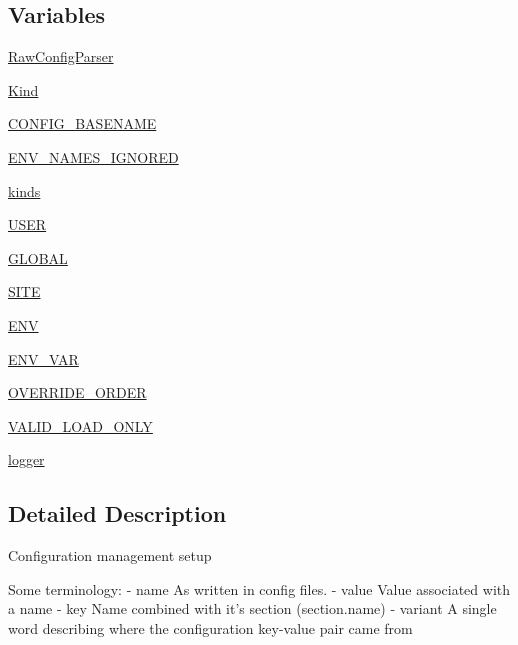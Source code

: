 \subsection*{Variables}
\begin{DoxyCompactItemize}
\item 
\hyperlink{namespacepip_1_1__internal_1_1configuration_a361d9f6d6543b48050190488d62c2578}{Raw\+Config\+Parser}
\item 
\hyperlink{namespacepip_1_1__internal_1_1configuration_acdbd1804aa9f7af14ec120c721d07514}{Kind}
\item 
\hyperlink{namespacepip_1_1__internal_1_1configuration_aeff9acc10ee6386b3ae91ac458894d28}{C\+O\+N\+F\+I\+G\+\_\+\+B\+A\+S\+E\+N\+A\+ME}
\item 
\hyperlink{namespacepip_1_1__internal_1_1configuration_ab592357a85c54489bd8a96208dfcadfa}{E\+N\+V\+\_\+\+N\+A\+M\+E\+S\+\_\+\+I\+G\+N\+O\+R\+ED}
\item 
\hyperlink{namespacepip_1_1__internal_1_1configuration_aee310fce28f137a503a38f842e42cfb3}{kinds}
\item 
\hyperlink{namespacepip_1_1__internal_1_1configuration_a831d1d031a4570a4ff6fdf11a30e3da3}{U\+S\+ER}
\item 
\hyperlink{namespacepip_1_1__internal_1_1configuration_a6a0959d1bd2012256f376680ea1f6ec4}{G\+L\+O\+B\+AL}
\item 
\hyperlink{namespacepip_1_1__internal_1_1configuration_af842e64d99f6d7f2df46621a0d4ae632}{S\+I\+TE}
\item 
\hyperlink{namespacepip_1_1__internal_1_1configuration_ad78865caf3d4a2db2bc21b98deb65f69}{E\+NV}
\item 
\hyperlink{namespacepip_1_1__internal_1_1configuration_ab1d954b1a189133a70aa0cf038c77209}{E\+N\+V\+\_\+\+V\+AR}
\item 
\hyperlink{namespacepip_1_1__internal_1_1configuration_adf4aab6f8125f525d04a41d58023c649}{O\+V\+E\+R\+R\+I\+D\+E\+\_\+\+O\+R\+D\+ER}
\item 
\hyperlink{namespacepip_1_1__internal_1_1configuration_a031ce0eb9adc82b6e3bab2f2a967ec93}{V\+A\+L\+I\+D\+\_\+\+L\+O\+A\+D\+\_\+\+O\+N\+LY}
\item 
\hyperlink{namespacepip_1_1__internal_1_1configuration_abd083d8243bc9be21b28e14a2973ef59}{logger}
\end{DoxyCompactItemize}


\subsection{Detailed Description}
\begin{DoxyVerb}Configuration management setup

Some terminology:
- name
  As written in config files.
- value
  Value associated with a name
- key
  Name combined with it's section (section.name)
- variant
  A single word describing where the configuration key-value pair came from
\end{DoxyVerb}
 

